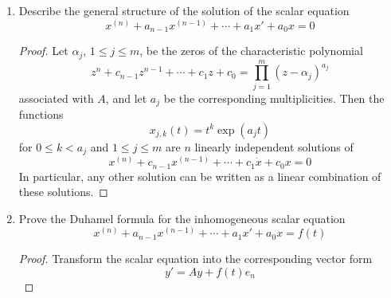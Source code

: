 \documentclass[../psets.tex]{subfiles}
\begin{document}
\begin{enumerate}
    \begin{proof}
        \textbf{Stable subspace} (of $x_0$ under $A$): The space of all generalized eigenvectors of $A$ corresponding to eigenvalues $\lambda$ with $\Ree\lambda<0$. \emph{Also known as} \textbf{attracting subspace}. \emph{Denoted by} $\bm{\pmb{\mathbb{E}}_s}$.\par
        \textbf{Unstable subspace} (of $x_0$ under $A$): The space of all generalized eigenvectors of $A$ corresponding to eigenvalues $\lambda$ with $\Ree\lambda>0$. \emph{Also known as} \textbf{repelling subspace}. \emph{Denoted by} $\bm{\pmb{\mathbb{E}}_u}$.
    \end{proof}
    \item Describe the general structure of the solution of the scalar equation
    \begin{equation*}
        x^{(n)}+a_{n-1}x^{(n-1)}+\cdots+a_1x'+a_0x = 0
    \end{equation*}
    \begin{proof}
        Let $\alpha_j$, $1\leq j\leq m$, be the zeros of the characteristic polynomial
        \begin{equation*}
            z^n+c_{n-1}z^{n-1}+\cdots+c_1z+c_0 = \prod_{j=1}^m(z-\alpha_j)^{a_j}
        \end{equation*}
        associated with $A$, and let $a_j$ be the corresponding multiplicities. Then the functions
        \begin{equation*}
            x_{j,k}(t) = t^k\exp(a_jt)
        \end{equation*}
        for $0\leq k<a_j$ and $1\leq j\leq m$ are $n$ linearly independent solutions of
        \begin{equation*}
            x^{(n)}+c_{n-1}x^{(n-1)}+\cdots+c_1\dot{x}+c_0x = 0
        \end{equation*}
        In particular, any other solution can be written as a linear combination of these solutions.
    \end{proof}
    \item Prove the Duhamel formula for the inhomogeneous scalar equation
    \begin{equation*}
        x^{(n)}+a_{n-1}x^{(n-1)}+\cdots+a_1x'+a_0x = f(t)
    \end{equation*}
    \begin{proof}
        Transform the scalar equation into the corresponding vector form
        \begin{equation*}
            y' = Ay+f(t)e_n
        \end{equation*}

\end{proof}
\end{enumerate}
\end{document}
